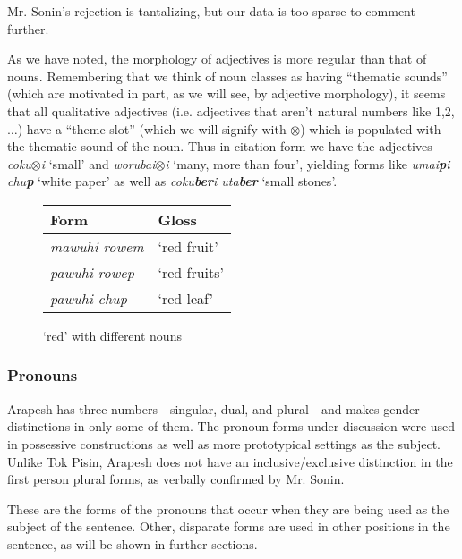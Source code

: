 \documentclass[pdftex,12pt,letterpaper]{article}
\begin{document}
 \noindent Mr. Sonin's rejection is tantalizing, but our data is too sparse to comment further.

 As we have noted, the morphology of adjectives is more regular than that of nouns. Remembering that we think of noun classes as having ``thematic sounds'' (which are motivated in part, as we will see, by adjective morphology), it seems that all qualitative adjectives (i.e. adjectives that aren't natural numbers like 1,2,$\ldots$) have a ``theme slot'' (which we will signify with $\otimes$) which is populated with the thematic sound of the noun. Thus in citation form we have the adjectives \emph{coku$\otimes$i} `small' and \emph{worubai$\otimes$i} `many, more than four', yielding forms like \emph{umai\textbf{p}i chu\textbf{p}} `white paper' as well as \emph{coku\textbf{ber}i uta\textbf{ber}} `small stones'.

 \begin{figure}[t]
 \begin{center}
 \def\arraystretch{1.4}
 \begin{tabular}{| l | l |}\hline
 Form & Gloss \\\hline
 \emph{mawuhi rowem} & `red fruit' \\\hline
 \emph{pawuhi rowep} & `red fruits' \\\hline
 \emph{pawuhi chup} & `red leaf' \\\hline

 \end{tabular}
 \end{center}
 \caption{`red' with different nouns}
 \end{figure}

 \subsubsection{Pronouns}

 Arapesh has three numbers---singular, dual, and plural---and makes gender distinctions in only some of them. The pronoun forms under discussion were used in possessive constructions as well as more prototypical settings as the subject. Unlike Tok Pisin, Arapesh does not have an inclusive/exclusive distinction in the first person plural forms, as verbally confirmed by Mr. Sonin.
 
 These are the forms of the pronouns that occur when they are being used as the subject of the sentence. Other, disparate forms are used in other positions in the sentence, as will be shown in further sections.
\end{document}
